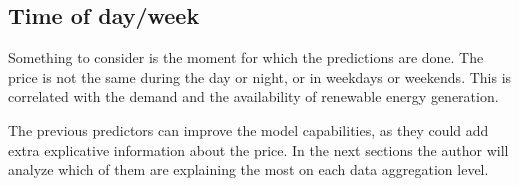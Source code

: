 \subsection{Time of day/week}
Something to consider is the moment for which the predictions are done.
The price is not the same during the day or night, or in weekdays or weekends.
This is correlated with the demand and the availability of renewable energy generation.

\vspace{1.3cm}

\noindent The previous predictors can improve the model capabilities, as they could add extra explicative information about the price.
In the next sections the author will analyze which of them are explaining the most on each data aggregation level.

